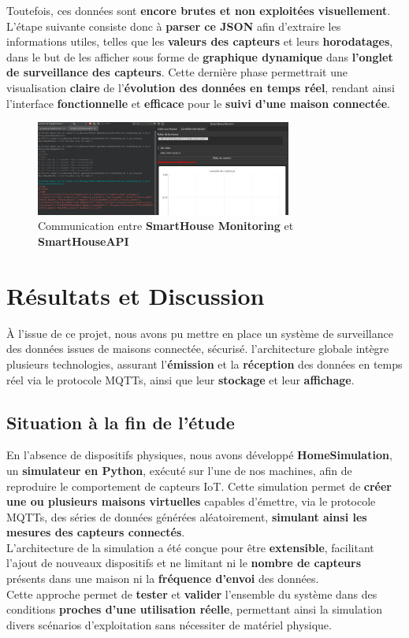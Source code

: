 \documentclass[10pt, a4paper]{report}
\begin{document}
	Toutefois, ces données sont \textbf{encore brutes et non exploitées visuellement}. L'étape suivante consiste donc à \textbf{parser ce JSON} afin d’extraire les informations utiles, telles que les \textbf{valeurs des capteurs} et leurs \textbf{horodatages}, dans le but de les afficher sous forme de\textbf{ graphique dynamique} dans \textbf{l’onglet de surveillance des capteurs}. Cette dernière phase permettrait une visualisation \textbf{claire} de l’\textbf{évolution des données en temps réel}, rendant ainsi l’interface  \textbf{fonctionnelle} et \textbf{efficace} pour le \textbf{suivi d’une maison connectée}.
		\begin{figure}[h!]
		\centering
		\includegraphics[width=0.75\textwidth]{ressources/img/preuves/preuveQTApi}
		\caption{Communication entre \textbf{SmartHouse Monitoring} et \textbf{SmartHouseAPI}}
		\label{fig:preuveQTApi}
	\end{figure}
	
	
	
	\chapter{Résultats et Discussion}
	À l’issue de ce projet, nous avons pu mettre en place un système de surveillance des données issues de maisons connectée, sécurisé. l'architecture globale intègre plusieurs technologies, assurant l'\textbf{émission} et la \textbf{réception} des données en temps réel via le protocole MQTTs, ainsi que leur \textbf{stockage} et leur \textbf{affichage}.\\
	\section{Situation à la fin de l’étude}

	En l'absence de dispositifs physiques, nous avons développé \textbf{HomeSimulation}, un \textbf{simulateur en Python}, exécuté sur l’une de nos machines, afin de reproduire le comportement de capteurs IoT. Cette simulation permet de \textbf{créer une ou plusieurs maisons virtuelles} capables d’émettre, via le protocole MQTTs, des séries de données générées aléatoirement, \textbf{simulant ainsi les mesures des capteurs connectés}.\\
	L’architecture de la simulation a été conçue pour être \textbf{extensible}, facilitant l’ajout de nouveaux dispositifs et ne limitant ni le \textbf{nombre de capteurs} présents dans une maison ni la \textbf{fréquence d’envoi} des données.\\
	Cette approche permet de \textbf{tester} et \textbf{valider} l’ensemble du système dans des conditions \textbf{proches d’une utilisation réelle}, permettant ainsi la simulation divers scénarios d’exploitation sans nécessiter de matériel physique.\\
	
\end{document}
